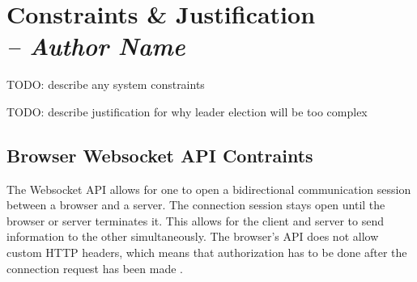 \chapter{Constraints \& Justification \\
  \small{\textit{-- Author Name}}
  \label{Chapter::ConstraintsJustification}}


TODO: describe any system constraints

TODO: describe justification for why leader election will be too complex

\section{Browser Websocket API Contraints}

The Websocket API allows for one to open a bidirectional communication session between a browser and a server. The connection session stays open until the browser or server terminates it. 
This allows for the client and server to send information to the other simultaneously. The browser's API does not allow custom HTTP headers, which means that authorization has to be done after the connection request has been made \cite{MDNWebSocket} \cite{HerokuWebSocket}.